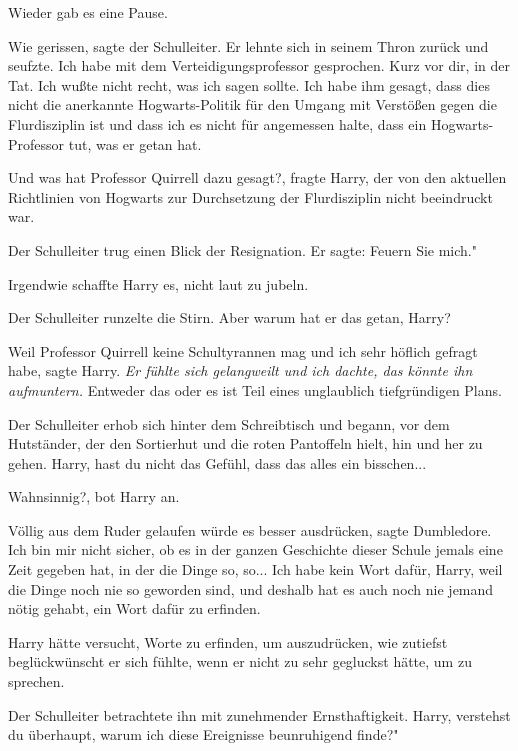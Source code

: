 Wieder gab es eine Pause.

\glqq Wie gerissen\grqq{}, sagte der Schulleiter. Er lehnte sich in seinem Thron
zurück und seufzte. \glqq Ich habe mit dem Verteidigungsprofessor gesprochen.
Kurz vor dir, in der Tat. Ich wußte nicht recht, was ich sagen sollte. Ich habe
ihm gesagt, dass dies nicht die anerkannte Hogwarts-Politik für den Umgang mit
Verstößen gegen die Flurdisziplin ist und dass ich es nicht für angemessen
halte, dass ein Hogwarts-Professor tut, was er getan hat.\grqq{}

\glqq Und was hat Professor Quirrell dazu gesagt?\grqq{}, fragte Harry, der von
den aktuellen Richtlinien von Hogwarts zur Durchsetzung der Flurdisziplin nicht
beeindruckt war.

Der Schulleiter trug einen Blick der Resignation. \glqq Er sagte: Feuern Sie
mich."

Irgendwie schaffte Harry es, nicht laut zu jubeln.

Der Schulleiter runzelte die Stirn. \glqq Aber warum hat er das getan,
Harry?\grqq{}

\glqq Weil Professor Quirrell keine Schultyrannen mag und ich sehr höflich
gefragt habe\grqq{}, sagte Harry. \emph{Er fühlte sich gelangweilt und ich
dachte, das könnte ihn aufmuntern.} \glqq Entweder das oder es ist Teil eines
unglaublich tiefgründigen Plans.\grqq{}

Der Schulleiter erhob sich hinter dem Schreibtisch und begann, vor dem
Hutständer, der den Sortierhut und die roten Pantoffeln hielt, hin und her zu
gehen. \glqq Harry, hast du nicht das Gefühl, dass das alles ein
bisschen...\grqq{}

\glqq Wahnsinnig?\grqq{}, bot Harry an.

\glqq Völlig aus dem Ruder gelaufen würde es besser ausdrücken\grqq{}, sagte
Dumbledore. \glqq Ich bin mir nicht sicher, ob es in der ganzen Geschichte
dieser Schule jemals eine Zeit gegeben hat, in der die Dinge so, so... Ich habe
kein Wort dafür, Harry, weil die Dinge noch nie so geworden sind, und deshalb
hat es auch noch nie jemand nötig gehabt, ein Wort dafür zu erfinden.\grqq{}

Harry hätte versucht, Worte zu erfinden, um auszudrücken, wie zutiefst
beglückwünscht er sich fühlte, wenn er nicht zu sehr gegluckst hätte, um zu
sprechen.

Der Schulleiter betrachtete ihn mit zunehmender Ernsthaftigkeit. \glqq Harry,
verstehst du überhaupt, warum ich diese Ereignisse beunruhigend finde?"

